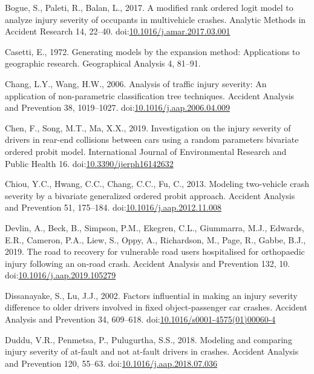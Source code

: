 \documentclass[]{elsarticle} %
\begin{document}
\leavevmode\hypertarget{ref-Bogue2017modified}{}%
Bogue, S., Paleti, R., Balan, L., 2017. A modified rank ordered logit
model to analyze injury severity of occupants in multivehicle crashes.
Analytic Methods in Accident Research 14, 22--40.
doi:\href{https://doi.org/10.1016/j.amar.2017.03.001}{10.1016/j.amar.2017.03.001}

\leavevmode\hypertarget{ref-Casetti1972generating}{}%
Casetti, E., 1972. Generating models by the expansion method:
Applications to geographic research. Geographical Analysis 4, 81--91.

\leavevmode\hypertarget{ref-Chang2006analysis}{}%
Chang, L.Y., Wang, H.W., 2006. Analysis of traffic injury severity: An
application of non-parametric classification tree techniques. Accident
Analysis and Prevention 38, 1019--1027.
doi:\href{https://doi.org/10.1016/j.aap.2006.04.009}{10.1016/j.aap.2006.04.009}

\leavevmode\hypertarget{ref-Chen2019investigation}{}%
Chen, F., Song, M.T., Ma, X.X., 2019. Investigation on the injury
severity of drivers in rear-end collisions between cars using a random
parameters bivariate ordered probit model. International Journal of
Environmental Research and Public Health 16.
doi:\href{https://doi.org/10.3390/ijerph16142632}{10.3390/ijerph16142632}

\leavevmode\hypertarget{ref-Chiou2013modeling}{}%
Chiou, Y.C., Hwang, C.C., Chang, C.C., Fu, C., 2013. Modeling
two-vehicle crash severity by a bivariate generalized ordered probit
approach. Accident Analysis and Prevention 51, 175--184.
doi:\href{https://doi.org/10.1016/j.aap.2012.11.008}{10.1016/j.aap.2012.11.008}

\leavevmode\hypertarget{ref-Devlin2019road}{}%
Devlin, A., Beck, B., Simpson, P.M., Ekegren, C.L., Giummarra, M.J.,
Edwards, E.R., Cameron, P.A., Liew, S., Oppy, A., Richardson, M., Page,
R., Gabbe, B.J., 2019. The road to recovery for vulnerable road users
hospitalised for orthopaedic injury following an on-road crash. Accident
Analysis and Prevention 132, 10.
doi:\href{https://doi.org/10.1016/j.aap.2019.105279}{10.1016/j.aap.2019.105279}

\leavevmode\hypertarget{ref-Dissanayake2002factors}{}%
Dissanayake, S., Lu, J.J., 2002. Factors influential in making an injury
severity difference to older drivers involved in fixed object-passenger
car crashes. Accident Analysis and Prevention 34, 609--618.
doi:\href{https://doi.org/10.1016/s0001-4575(01)00060-4}{10.1016/s0001-4575(01)00060-4}

\leavevmode\hypertarget{ref-Duddu2018modeling}{}%
Duddu, V.R., Penmetsa, P., Pulugurtha, S.S., 2018. Modeling and
comparing injury severity of at-fault and not at-fault drivers in
crashes. Accident Analysis and Prevention 120, 55--63.
doi:\href{https://doi.org/10.1016/j.aap.2018.07.036}{10.1016/j.aap.2018.07.036}
\end{document}
